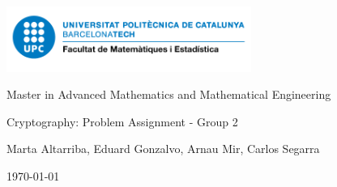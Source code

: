 \documentclass[a4paper, 10pt]{article}
\theoremstyle{definition} %
\begin{document}
\onehalfspacing
\pagestyle{empty}

\begin{center}
    \vspace{2cm}
    \includegraphics[width=8cm]{img/logo_fme.png}
    \vspace{2cm}

    \Large
    Master in Advanced Mathematics and Mathematical Engineering
    \vspace{0.5cm}

    \LARGE
    Cryptography: Problem Assignment - Group 2

    \vspace{0.5cm}
    \large
    Marta Altarriba, Eduard Gonzalvo, Arnau Mir, Carlos Segarra

    \vspace{0.5cm}
    \normalsize
    \today

    \vspace{1cm}

\end{center}

\tableofcontents


\newpage
\pagestyle{fancy}

\newpage

\newpage

\newpage

\newpage

\end{document}
